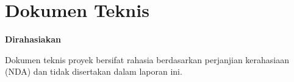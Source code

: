 \chapter{Dokumen Teknis}\label{app:dokumen-teknis}

\noindent\textbf{Dirahasiakan}\par
\noindent Dokumen teknis proyek bersifat rahasia berdasarkan perjanjian kerahasiaan (NDA) dan tidak disertakan dalam laporan ini.
